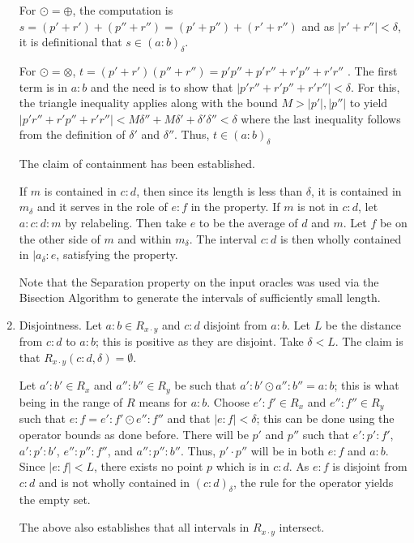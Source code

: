 \documentclass[12pt]{article}
\begin{document}
\begin{enumerate}
    For $\odot = \oplus$, the computation is $s = (p'+r') + (p''+ r'') = (p' + p'') + (r' + r'')$ and as $|r'+r''| < \delta$, it is definitional that $s \in (a:b)_\delta$. 

    For $\odot = \otimes$, $t = (p'+r')(p''+ r'') = p'p'' + p'r'' + r' p'' + r' r''$ . The first term is in $a:b$ and the need is to show that $|p'r'' + r'p'' + r' r''|< \delta$. For this, the triangle inequality applies along with the bound $M > |p'|, |p''|$ to yield $|p'r'' + r'p'' + r' r''| < M \delta'' + M \delta' + \delta' \delta'' < \delta$ where the last inequality follows from the definition of $\delta'$ and $\delta''$.  Thus, $t \in (a:b)_\delta $

    The claim of containment has been established. 

    If $m$ is contained in $c:d$, then since its length is less than $\delta$, it is contained in $m_\delta$ and it serves in the role of $e:f$ in the property. If $m$ is not in $c:d$, let $a:c:d:m$ by relabeling. Then take $e$ to be the average of $d$ and $m$. Let $f$ be on the other side of $m$ and within $m_\delta$. The interval $c:d$ is then wholly contained in $|a_\delta:e$, satisfying the property. 

    Note that the Separation property on the input oracles was used via the Bisection Algorithm to generate the intervals of sufficiently small length. 
    
    \item Disjointness. Let $a:b \in R_{x\cdot y}$ and $c:d$ disjoint from $a:b$. Let $L$ be the distance from $c:d$ to $a:b$; this is positive as they are disjoint. Take $\delta < L$. The claim is that $R_{x \cdot y} (c:d, \delta) = \emptyset$. 
    
    Let $a':b' \in R_x$ and $a'':b'' \in R_y$ be such that $a':b' \odot a'':b'' = a:b$; this is what being in the range of $R$ means for $a:b$. Choose $e':f' \in R_x$ and $e'':f'' \in R_y$ such that $e:f = e':f' \odot e'' : f'' $ and that $|e:f| < \delta$; this can be done using the operator bounds as done before.  There will be $p'$ and $p''$ such that $e':p':f'$, $a':p':b'$, $e'':p'':f''$, and $a'':p'':b''$. Thus, $p' \cdot p''$ will be in both $e:f$ and $a:b$. Since $|e:f|< L$, there exists no point $p$ which is in $c:d$. As $e:f$ is disjoint from $c:d$ and is not wholly contained in $(c:d)_\delta$, the rule for the operator yields the empty set. 

    The above also establishes that all intervals in $R_{x \cdot y}$ intersect. 


\end{enumerate}
\end{document}
